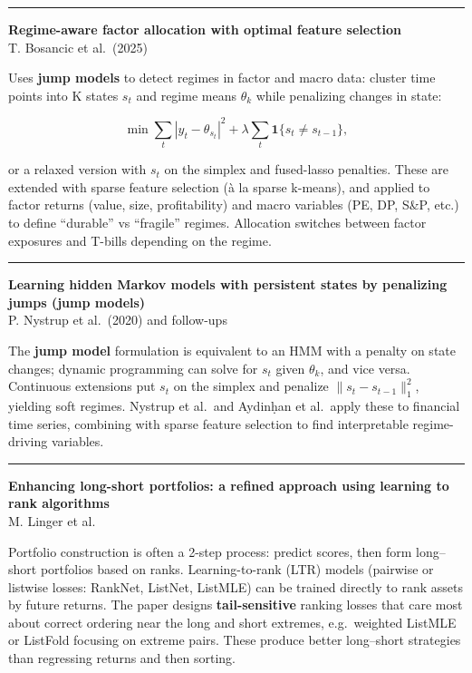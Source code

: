 \documentclass[a5paper]{article}
\begin{document}
\begin{center}\rule{0.5\linewidth}{0.5pt}\end{center}

\textbf{Regime-aware factor allocation with optimal feature selection}\\
T. Bosancic et al.~(2025)

Uses \textbf{jump models} to detect regimes in factor and macro data:
cluster time points into K states $s_t$ and regime means $\theta_k$ while
penalizing changes in state:

\[ \min \sum_t |y_t - \theta_{s_t}|^2 +
\lambda \sum_t \mathbf{1}\{s_t\neq s_{t-1}\}, \]

or a relaxed version with $s_t$ on the simplex and fused-lasso penalties.
These are extended with sparse feature selection (à la sparse k-means),
and applied to factor returns (value, size, profitability) and macro
variables (PE, DP, S\&P, etc.) to define ``durable'' vs ``fragile''
regimes. Allocation switches between factor exposures and T-bills
depending on the regime.

\begin{center}\rule{0.5\linewidth}{0.5pt}\end{center}

\textbf{Learning hidden Markov models with persistent states by
penalizing jumps (jump models)}\\
P. Nystrup et al.~(2020) and follow-ups

The \textbf{jump model} formulation is equivalent to an HMM with a
penalty on state changes; dynamic programming can solve for $s_t$ given
$\theta_k$, and vice versa. Continuous extensions put $s_t$ on the simplex and
penalize $\| s_t-s_{t-1}\|_1^2$, yielding soft
regimes. Nystrup et al.~and Aydinḥan et al.~apply these to financial
time series, combining with sparse feature selection to find
interpretable regime-driving variables.

\begin{center}\rule{0.5\linewidth}{0.5pt}\end{center}

\textbf{Enhancing long-short portfolios: a refined approach using
learning to rank algorithms}\\
M. Linger et al.

Portfolio construction is often a 2-step process: predict scores, then
form long--short portfolios based on ranks. Learning-to-rank (LTR)
models (pairwise or listwise losses: RankNet, ListNet, ListMLE) can be
trained directly to rank assets by future returns. The paper designs
\textbf{tail-sensitive} ranking losses that care most about correct
ordering near the long and short extremes, e.g.~weighted ListMLE or
ListFold focusing on extreme pairs. These produce better long--short
strategies than regressing returns and then sorting.
\end{document}
